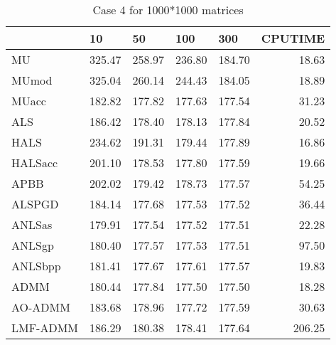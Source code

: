 \documentclass{article}
\begin{document}
\begin{table}[H]
		\caption{Case 4 for 1000*1000 matrices}
	\centering
	\begin{tabular}{|l|r|r|r|r|r|}
		\hline
		& \multicolumn{1}{l|}{10} & \multicolumn{1}{l|}{50} & \multicolumn{1}{l|}{100} & \multicolumn{1}{l|}{300} & \multicolumn{1}{l|}{CPUTIME} \\ \hline
		MU       & 325.47                  & 258.97                  & 236.80                   & 184.70                   & 18.63                        \\ \hline
		MUmod    & 325.04                  & 260.14                  & 244.43                   & 184.05                   & 18.89                        \\ \hline
		MUacc    & 182.82                  & 177.82                  & 177.63                   & 177.54                   & 31.23                        \\ \hline
		ALS      & 186.42                  & 178.40                  & 178.13                   & 177.84                   & 20.52                        \\ \hline
		HALS     & 234.62                  & 191.31                  & 179.44                   & 177.89                   & 16.86                        \\ \hline
		HALSacc  & 201.10                  & 178.53                  & 177.80                   & 177.59                   & 19.66                        \\ \hline
		APBB     & 202.02                  & 179.42                  & 178.73                   & 177.57                   & 54.25                        \\ \hline
		ALSPGD   & 184.14                  & 177.68                  & 177.53                   & 177.52                   & 36.44                        \\ \hline
		ANLSas   & 179.91                  & 177.54                  & 177.52                   & 177.51                   & 22.28                        \\ \hline
		ANLSgp   & 180.40                  & 177.57                  & 177.53                   & 177.51                   & 97.50                        \\ \hline
		ANLSbpp  & 181.41                  & 177.67                  & 177.61                   & 177.57                   & 19.83                        \\ \hline
		ADMM     & 180.44                  & 177.84                  & 177.50                   & 177.50                   & 18.28                        \\ \hline
		AO-ADMM  & 183.68                  & 178.96                  & 177.72                   & 177.59                   & 30.63                        \\ \hline
		LMF-ADMM & 186.29                  & 180.38                  & 178.41                   & 177.64                   & 206.25                       \\ \hline
	\end{tabular}
\end{table}
\end{document}

